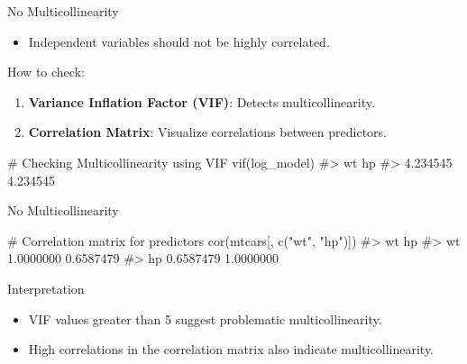 \documentclass[
  18 pt,
  ignorenonframetext,
  aspectratio=1610,
]{beamer}
\newenvironment{Shaded}{\begin{snugshade}}{\end{snugshade}}
\newcommand{\CommentTok}[1]{\textcolor[rgb]{0.37,0.37,0.37}{#1}}
\newcommand{\FunctionTok}[1]{\textcolor[rgb]{0.28,0.35,0.67}{#1}}
\newcommand{\NormalTok}[1]{\textcolor[rgb]{0.00,0.23,0.31}{#1}}
\newcommand{\StringTok}[1]{\textcolor[rgb]{0.13,0.47,0.30}{#1}}
\providecommand{\tightlist}{%
  \setlength{\itemsep}{0pt}\setlength{\parskip}{0pt}}\usepackage{longtable,booktabs,array}
\begin{document}
\begin{frame}[fragile]{No Multicollinearity}
\protect\hypertarget{no-multicollinearity}{}
\begin{itemize}
\tightlist
\item
  Independent variables should not be highly correlated.
\end{itemize}

\begin{block}{How to check:}
\protect\hypertarget{how-to-check-6}{}
\begin{enumerate}
\tightlist
\item
  \textbf{Variance Inflation Factor (VIF)}: Detects multicollinearity.
\item
  \textbf{Correlation Matrix}: Visualize correlations between
  predictors.
\end{enumerate}

\begin{Shaded}
\begin{Highlighting}[]
\CommentTok{\# Checking Multicollinearity using VIF}
\FunctionTok{vif}\NormalTok{(log\_model)}
\CommentTok{\#\textgreater{}       wt       hp }
\CommentTok{\#\textgreater{} 4.234545 4.234545}
\end{Highlighting}
\end{Shaded}
\end{block}
\end{frame}

\begin{frame}[fragile]{No Multicollinearity}
\protect\hypertarget{no-multicollinearity-1}{}
\begin{Shaded}
\begin{Highlighting}[]
\CommentTok{\# Correlation matrix for predictors}
\FunctionTok{cor}\NormalTok{(mtcars[, }\FunctionTok{c}\NormalTok{(}\StringTok{"wt"}\NormalTok{, }\StringTok{"hp"}\NormalTok{)])}
\CommentTok{\#\textgreater{}           wt        hp}
\CommentTok{\#\textgreater{} wt 1.0000000 0.6587479}
\CommentTok{\#\textgreater{} hp 0.6587479 1.0000000}
\end{Highlighting}
\end{Shaded}

\begin{block}{Interpretation}
\protect\hypertarget{interpretation-10}{}
\begin{itemize}
\tightlist
\item
  VIF values greater than 5 suggest problematic multicollinearity.
\item
  High correlations in the correlation matrix also indicate
  multicollinearity.
\end{itemize}
\end{block}
\end{frame}
\end{document}
